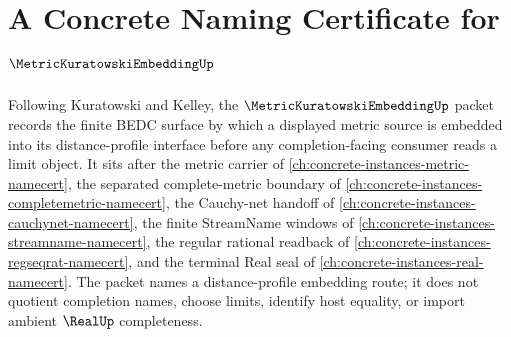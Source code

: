 \chapter{A Concrete Naming Certificate for $\MetricKuratowskiEmbeddingUp$}
\label{ch:concrete-instances-metric-kuratowski-embedding-namecert}

Following Kuratowski and Kelley, the $\MetricKuratowskiEmbeddingUp$ packet records the finite BEDC surface by which a displayed metric source is embedded into its distance-profile interface before any completion-facing consumer reads a limit object. It sits after the metric carrier of \autoref{ch:concrete-instances-metric-namecert}, the separated complete-metric boundary of \autoref{ch:concrete-instances-completemetric-namecert}, the Cauchy-net handoff of \autoref{ch:concrete-instances-cauchynet-namecert}, the finite StreamName windows of \autoref{ch:concrete-instances-streamname-namecert}, the regular rational readback of \autoref{ch:concrete-instances-regseqrat-namecert}, and the terminal Real seal of \autoref{ch:concrete-instances-real-namecert}. The packet names a distance-profile embedding route; it does not quotient completion names, choose limits, identify host equality, or import ambient $\RealUp$ completeness.

